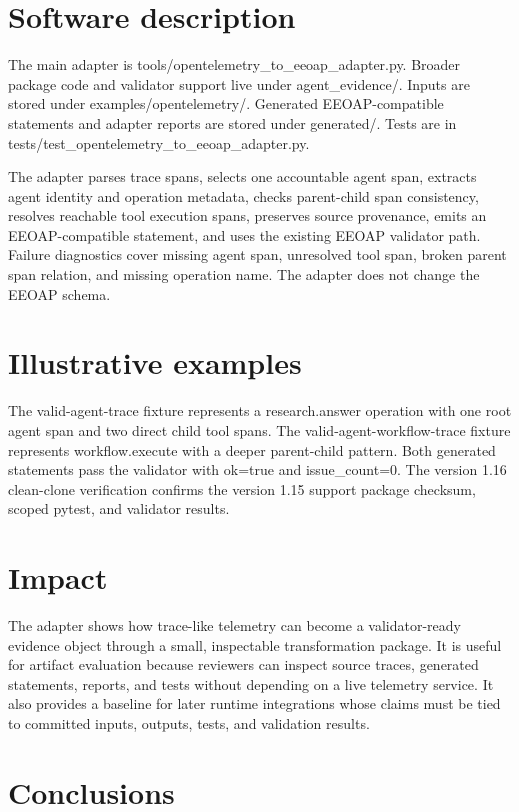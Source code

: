 \documentclass[preprint,12pt,a4paper]{elsarticle}
\begin{document}
\section{Software description}

The main adapter is tools/opentelemetry\_to\_eeoap\_adapter.py. Broader package
code and validator support live under agent\_evidence/. Inputs are stored under
examples/opentelemetry/. Generated EEOAP-compatible statements and adapter
reports are stored under generated/. Tests are in
tests/test\_opentelemetry\_to\_eeoap\_adapter.py.

The adapter parses trace spans, selects one accountable agent span, extracts
agent identity and operation metadata, checks parent-child span consistency,
resolves reachable tool execution spans, preserves source provenance, emits an
EEOAP-compatible statement, and uses the existing EEOAP validator path. Failure
diagnostics cover missing agent span, unresolved tool span, broken parent span
relation, and missing operation name. The adapter does not change the EEOAP
schema.

\section{Illustrative examples}

The valid-agent-trace fixture represents a research.answer operation with one
root agent span and two direct child tool spans. The valid-agent-workflow-trace
fixture represents workflow.execute with a deeper parent-child pattern. Both
generated statements pass the validator with ok=true and issue_count=0. The
version 1.16 clean-clone verification confirms the version 1.15 support package
checksum, scoped pytest, and validator results.

\section{Impact}

The adapter shows how trace-like telemetry can become a validator-ready
evidence object through a small, inspectable transformation package. It is
useful for artifact evaluation because reviewers can inspect source traces,
generated statements, reports, and tests without depending on a live telemetry
service. It also provides a baseline for later runtime integrations whose
claims must be tied to committed inputs, outputs, tests, and validation results.

\section{Conclusions}
\end{document}
